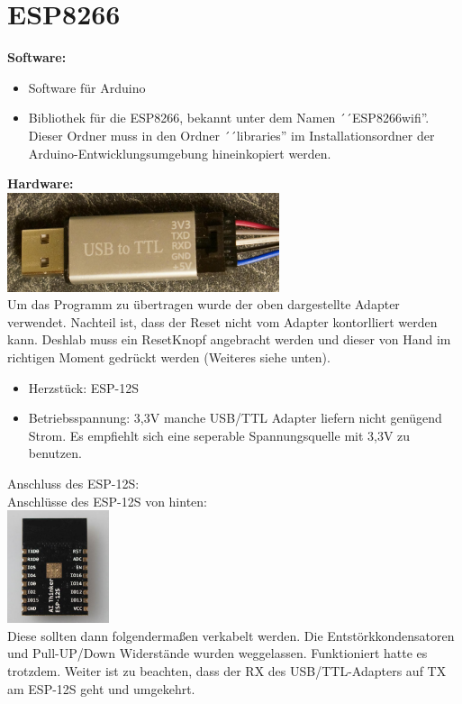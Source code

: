 \documentclass[11pt,fleqn]{book} %
\numberwithin{equation}{section} %
\numberwithin{figure}{section} %
\numberwithin{table}{section} %
\begin{document}
\section{ESP8266}
\textbf{Software:}\\
\begin{itemize}
 \item Software für Arduino
 \item Bibliothek für die ESP8266, bekannt unter dem Namen ´´ESP8266wifi''. Dieser Ordner muss in den Ordner ´´libraries'' im Installationsordner der Arduino-Entwicklungsumgebung hineinkopiert werden.
\end{itemize}
\textbf{Hardware:\\}
\includegraphics[width=8cm]{Pictures/DSC01317.jpg}\\
Um das Programm zu übertragen wurde der oben dargestellte Adapter verwendet. Nachteil ist, dass der Reset nicht vom Adapter kontorlliert werden kann. Deshlab muss ein ResetKnopf angebracht werden und dieser von Hand im richtigen Moment gedrückt werden (Weiteres siehe unten).
\begin{itemize}
 \item Herzstück: ESP-12S
 \item Betriebsspannung: 3,3V manche USB/TTL Adapter liefern nicht genügend Strom. Es empfiehlt sich eine seperable Spannungsquelle mit 3,3V zu benutzen.
\end{itemize}
Anschluss des ESP-12S:\\
\newpage
Anschlüsse des ESP-12S von hinten:\\
\includegraphics[width=3cm]{Pictures/esp-12s.jpg}\\
Diese sollten dann folgendermaßen verkabelt werden. Die Entstörkkondensatoren und Pull-UP/Down Widerstände wurden weggelassen. Funktioniert hatte es trotzdem. Weiter ist zu beachten, dass der RX des USB/TTL-Adapters auf TX am ESP-12S geht und umgekehrt.\\
\end{document}
